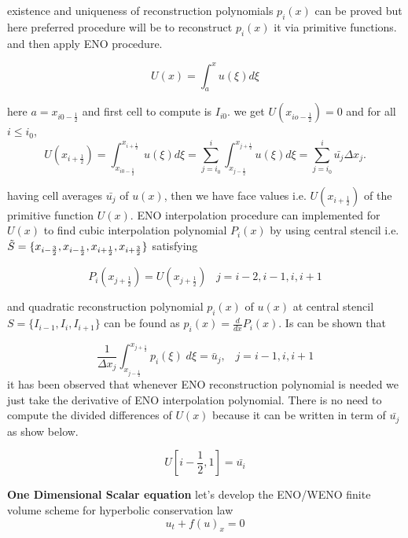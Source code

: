 \documentclass{article}
\begin{document}
\noindent existence and uniqueness of reconstruction polynomials $p_i(x)$ can be proved but here preferred procedure will be to reconstruct $p_i(x)$ it via primitive functions. and then apply ENO procedure.

\begin{equation}
    U(x) = \int _a^x u(\xi) d\xi 
\end{equation}

\noindent here $a= x_{i0 - \frac{1}{2}} $ and first cell to compute is $I_{i0}$. we get $U(x_{io - \frac{1}{2}}) = 0$ and for all $i \leq i_0$,
\begin{equation}
    U(x_{i+\frac{1}{2}}) = \int_{x_{i0 - \frac{1}{2}}}^ {x_{i + \frac{1}{2}}} u(\xi) d\xi = \sum_{j=i_0}^{i} \int_{x_{j - \frac{1}{2}}}^ {x_{j + \frac{1}{2}}} u(\xi) d\xi = \sum_{j=i_0}^{i} \bar{u_j} \Delta x_j.
\end{equation}

\noindent having cell averages $\bar{u_j}$ of $u(x)$, then we have face values i.e. $U(x_{i + \frac{1}{2}})$ of the primitive function $U(x)$. ENO interpolation procedure can implemented for $U(x)$ to find cubic interpolation polynomial $P_i(x)$ by using central stencil i.e. $\Tilde{S} = \{ x_{i-\frac{3}{2}},x_{i-\frac{1}{2}} , x_{i+\frac{1}{2}} , x_{i+\frac{3}{2}} \}$ satisfying

\begin{equation}
    P_i(x_{j+\frac{1}{2}}) = U(x_{j+\frac{1}{2}}) \;\;\; j = i-2,i-1,i,i+1
\end{equation}

\noindent and quadratic reconstruction polynomial $p_i(x)$ of $u(x)$ at central stencil  $S = \{ I_{i-1},I_i, I_{i+1}\}$ can be found as  $p_i(x) = \frac{d}{dx} P_i(x)$. Is can be shown that 

\begin{equation}
     \frac{1}{\Delta x_j} \int_{x_{j - \frac{1}{2}}}^{x_{j + \frac{1}{2}}} p_i(\xi)\;d\xi = \bar{u}_{j} , \;\;\; j=i-1,i,i+1
\end{equation}
\noindent it has been observed that whenever ENO reconstruction polynomial is needed we just take the derivative of ENO interpolation polynomial. There is no need to compute the divided differences of $U(x)$ because it can be written in term of $\bar{u_j}$ as show below.

\begin{equation}
    U[i-\frac{1}{2},1] = \bar{u_i}
\end{equation}

\noindent \textbf{One Dimensional Scalar equation} let's develop the ENO/WENO finite volume scheme for hyperbolic conservation law
\begin{equation}\label{conservation}
    u_t + f(u)_x = 0
\end{equation}
\end{document}
